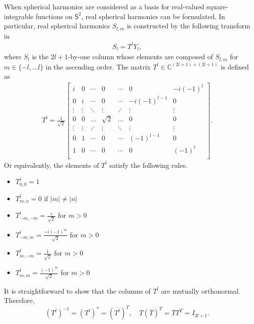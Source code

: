 \documentclass[onecolumn,11pt]{IEEEtran}
\newcommand{\Cp}{\ensuremath{\mathbb{C}}}
\newcommand{\Sph}{\ensuremath{\mathsf{S}}}
\begin{document}
When spherical harmonics are considered as a basis for real-valued square-integrable functions on $\Sph^2$, real spherical harmonics can be formulated. 
In particular, real spherical harmonics $S_{l,m}$ is constructed by the following transform in~\cite{BlaFloJMS97}
\begin{align}
    S_l = T^l Y_l,\label{eqn:YtoS}
\end{align}
where $S_l$ is the $2l+1$-by-one column whose elements are composed of $S_{l,m}$ for $m\in\{-l,\ldots l\}$ in the ascending order. 
The matrix $T^l\in\Cp^{(2l+1)\times(2l+1)}$ is defined as
\begin{align*}
    T^l=\frac{1}{\sqrt{2}}
    \begin{bmatrix}
        i & 0 & \cdots & 0 & \cdots & 0 & -i(-1)^l\\
        0 & i & \cdots & 0 & \cdots & -i(-1)^{l-1} & 0 \\
        \vdots & \vdots & \ddots &\vdots & \iddots & \vdots & \vdots\\
        0 & 0 & \hdots & \sqrt{2} & \hdots & 0 & 0 \\
        \vdots & \vdots & \iddots &\vdots & \ddots & \vdots & \vdots\\
        0 & 1 & \cdots & 0 & \cdots & (-1)^{l-1} & 0 \\
        1 & 0 & \cdots & 0 & \cdots & 0 & (-1)^l\\
    \end{bmatrix}.
\end{align*}
Or equivalently, the elements of $T^l$ satisfy the following rules.
\begin{itemize}
    \item $T^l_{0,0}=1$
    \item $T^l_{m,n}=0$ if $|m|\neq|n|$
    \item $T^l_{-m,-m} = \frac{i}{\sqrt{2}}$ for $m>0$
    \item $T^l_{-m,m}=\frac{-i(-1)^m}{\sqrt{2}}$ for $m>0$
    \item $T^l_{m,-m}=\frac{1}{\sqrt{2}}$ for $m>0$
    \item $T^l_{m,m}=\frac{(-1)^m}{\sqrt{2}} $ for $m>0$
\end{itemize}
It is straightforward to show that the columns of $T^l$ are mutually orthonormal. 
Therefore,
\[
    (T^l)^{-1} = (T^l)^* = (\overline{T^l})^T,\quad T (\overline T)^T= \overline{T} T^T = I_{2l+1}.
\]
\end{document}
